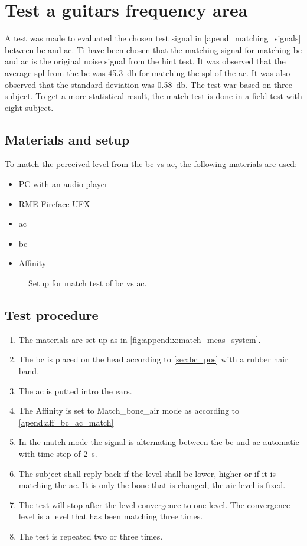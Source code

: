 
\chapter*{Test a guitars frequency area}
A test was made to evaluated the chosen test signal in \autoref{apend_matching_signals} between \gls{bc} and \gls{ac}. Ti have been chosen that the matching signal for matching \gls{bc} and \gls{ac} is the original noise signal from the \gls{hint} test. It was observed that the average \gls{spl} from the \gls{bc} was \SI{45.3}{\decibel} for matching the \gls{spl} of the \gls{ac}. It was also observed that the standard deviation was \SI{0.58}{\decibel}. The test war based on three subject. To get a more statistical result, the match test is done in a field test with eight subject.

\section*{Materials and setup}
To match the perceived level from the \gls{bc} vs \gls{ac}, the following materials are used:
\begin{itemize}
\item PC with an audio player
\item RME Fireface UFX
\item \gls{ac}
\item \gls{bc}
\item Affinity
\end{itemize}

\begin{figure}[H]
\centering
\def\svgwidth{\columnwidth}

\caption{Setup for match test of \gls{bc} vs \gls{ac}.}
		\label{fig:appendix:match_meas_system}
\end{figure}

\section*{Test procedure}


\begin{enumerate}
\item The materials are set up as in \autoref{fig:appendix:match_meas_system}.
\item The \gls{bc} is placed on the head according to \autoref{sec:bc_pos} with a rubber hair band.
\item The \gls{ac} is putted intro the ears.
\item The Affinity is set to Match_bone_air mode as according to \autoref{apend:aff_bc_ac_match} 
\item In the match mode the signal is alternating between the \gls{bc} and \gls{ac} automatic with time step of \SI{2}{\second}.
\item The  subject shall reply back if the level shall be lower, higher or if it is matching  the \gls{ac}. It is only the bone that is changed, the air level is fixed.
\item The test will stop after the level convergence to one level. The convergence level is a level that has been matching three times.
\item The test is repeated two or three times.
\end{enumerate}

